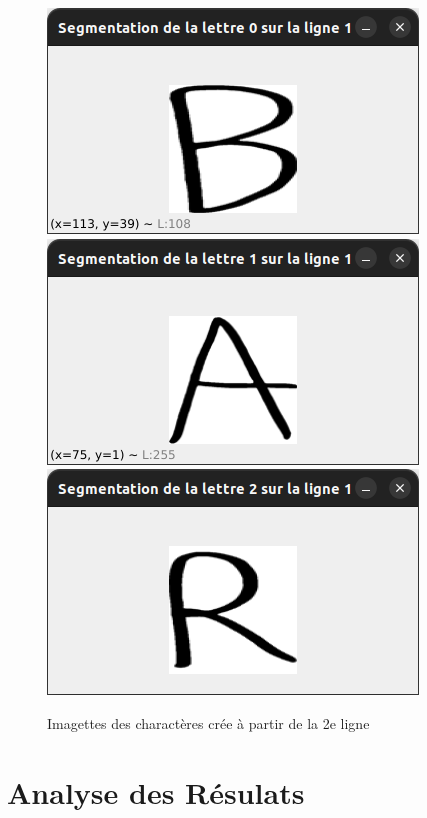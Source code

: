 \documentclass[a4paper]{article}
\begin{document}
			\begin{figure}
				\caption{Imagettes des charactères crée à partir de la 2e ligne}
				\includegraphics[scale=.3]{segmentation_B.png}
				\centering
				\includegraphics[scale=.3]{segmentation_A.png}
				\centering
				\includegraphics[scale=.3]{segmentation_R.png}
				\centering
			\end{figure}
	\newpage
	\section{Analyse des Résulats}
\end{document}
